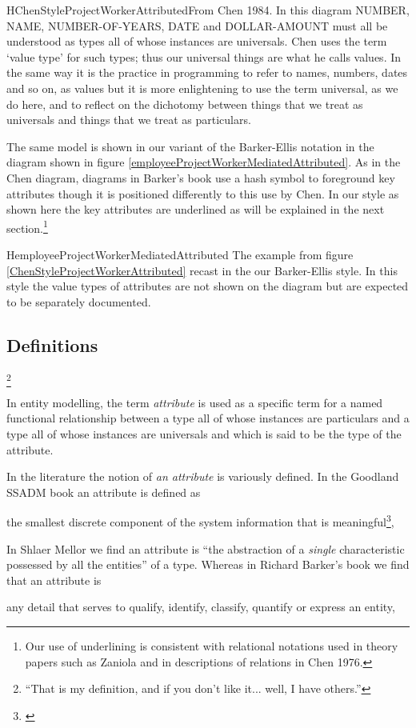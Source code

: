 \begin{erboxedFigure} {H}{ChenStyleProjectWorkerAttributed}{From Chen 1984. In this diagram NUMBER, NAME, NUMBER-OF-YEARS, DATE and DOLLAR-AMOUNT must all be understood as types all of whose instances are universals. Chen uses the term `value type' for such types;
thus our universal things are what he calls values. In the same way it is 
the practice in programming to refer to names, numbers, dates and so on, as values but it is more enlightening to use  the term universal, as we do here, and to reflect on  the dichotomy between things that we treat as universals and things that we treat as particulars. }

\end{erboxedFigure}

The same model is shown in our variant of the Barker-Ellis notation
 in the diagram shown in figure \ref{employeeProjectWorkerMediatedAttributed}.
As in the Chen diagram, diagrams in Barker's book use a hash symbol to foreground key attributes though it  is positioned differently to this use by Chen. In our style as shown here the key attributes are underlined as will be explained in the next section.\footnote{Our use of underlining is consistent with relational notations used in theory papers such as Zaniola and in descriptions of relations in Chen 1976.}
\begin{erboxedFigure} {H}{employeeProjectWorkerMediatedAttributed}
{The example from figure \ref{ChenStyleProjectWorkerAttributed} recast in the our Barker-Ellis style. 
In this style the value types of attributes are not shown on the diagram but are expected to be 
separately documented. }

\end{erboxedFigure}



\subsection{Definitions}\footnote{“That is my definition, and if you don’t like it... well, I have others.”}

\mynote
In entity modelling, the term \textit{attribute} is used as a specific term
for a named functional relationship between a type all of whose instances are particulars  and a type all of whose instances are universals and which is said to be the type of the attribute.

\mynote
In the literature the notion of \textit{an attribute} is variously defined.
In the Goodland SSADM book an attribute is defined as
\begin{erquote}
  the smallest discrete component of the system information that is meaningful\footnote{\cite{SSADM}},
\end{erquote}
In  Shlaer Mellor we find an attribute is 
``the abstraction of a \textit{single} characteristic possessed by all the entities''
of a type. Whereas in Richard Barker's book we find that an attribute is
\begin{erquote}
any detail that serves to qualify, identify, classify, quantify or express an  entity,
\end{erquote}


